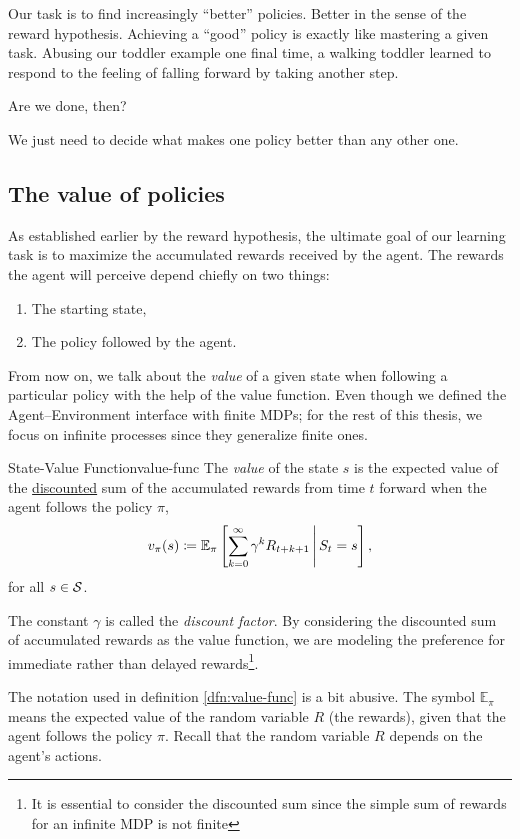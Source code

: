 Our task is to find increasingly ``better'' policies. Better in the sense of the
reward hypothesis. Achieving a ``good'' policy is exactly like mastering a given
task. Abusing our toddler example one final time, a walking toddler learned to
respond to the feeling of falling forward by taking another step.

Are we done, then? 

We just need to decide what makes one policy better than any other one.

\subsection{The value of policies}
As established earlier by the reward hypothesis, the ultimate goal of our
learning task is to maximize the accumulated rewards received by the agent. The
rewards the agent will perceive depend chiefly on two things:
\begin{enumerate}
	\item The starting state,
	\item The policy followed by the agent.
\end{enumerate}

From now on, we talk about the \textit{value} of a given state when following a
particular policy with the help of the value function. Even though we defined
the Agent--Environment interface with finite MDPs; for the rest of this thesis,
we focus on infinite processes since they generalize finite ones.

\begin{dfn}{State-Value Function}{value-func}
	The \emph{value} of the state $s$ is the expected value of the
	\underline{discounted} sum of the accumulated rewards from time $t$ forward
	when the agent follows the policy $\pi$,
	\[
		v_{\pi} (s) \coloneqq \mathbb{E}_{\pi} \left[\sum_{k=0}^{\infty} \gamma^{k} R_{t+k+1} \,\middle\vert\, S_{t} = s\right],
	\]
	for all $s \in \mathcal{S}$.
\end{dfn}

The constant $\gamma$ is called the \textit{discount factor}. By considering the
discounted sum of accumulated rewards as the value function, we are modeling the
preference for immediate rather than delayed rewards\footnote{It is essential to
consider the discounted sum since the simple sum of rewards for an infinite MDP
is not finite}. 

The notation used in definition \ref{dfn:value-func} is a bit abusive. The
symbol $\mathbb{E}_{\pi}$ means the expected value of the random variable $R$
(the rewards), given that the agent follows the policy $\pi$. Recall that the
random variable $R$ depends on the agent's actions.

